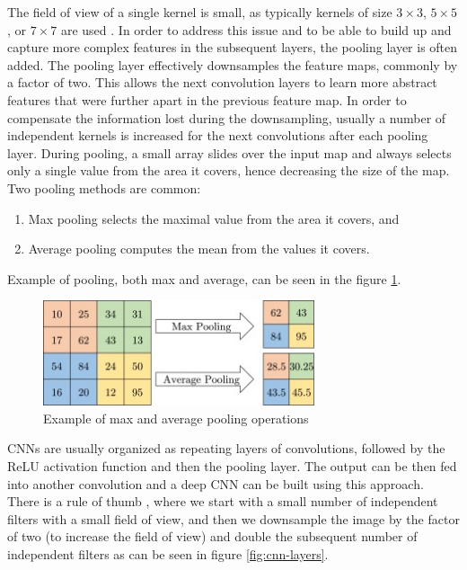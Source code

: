 The field of view of a single kernel is small, as typically kernels of size $3\!\times\!3$, $5\!\times\!5$, or $7\!\times\!7$ are used \cite{Santosh2022-2}. In order to address this issue and to be able to build up and capture more complex features in the subsequent layers, the pooling layer is often added. The pooling layer effectively downsamples the feature maps, commonly by a factor of two. This allows the next convolution layers to learn more abstract features that were further apart in the previous feature map. In order to compensate the information lost during the downsampling, usually a number of independent kernels is increased for the next convolutions after each pooling layer. During pooling, a small array slides over the input map and always selects only a single value from the area it covers, hence decreasing the size of the map. Two pooling methods are common:

\begin{enumerate}
    \item Max pooling selects the maximal value from the area it covers, and
    \item Average pooling computes the mean from the values it covers.
\end{enumerate}

Example of pooling, both max and average, can be seen in the figure \ref{fig:pooling}.

\begin{figure}[H]
\begin{centering}
\includegraphics[width=8cm]{assets/images/pooling.jpg}
\par\end{centering}
\caption{Example of max and average pooling operations \cite{Santosh2022-2}}
\label{fig:pooling}
\end{figure}

CNNs are usually organized as repeating layers of convolutions, followed by the ReLU activation function and then the pooling layer. The output can be then fed into another convolution and a deep CNN can be built using this approach. There is a rule of thumb \cite{Santosh2022-3}, where we start with a small number of independent filters with a small field of view, and then we downsample the image by the factor of two (to increase the field of view) and double the subsequent number of independent filters as can be seen in figure \ref{fig:cnn-layers}.

